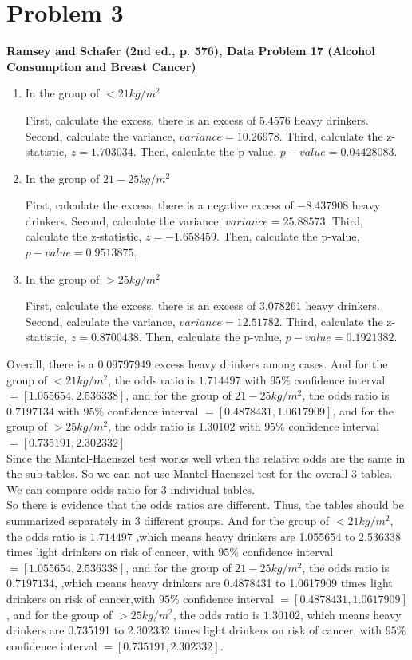 \documentclass[10pt,letterpaper]{article}
\begin{document}
\section*{Problem 3}
\textbf{Ramsey and Schafer (2nd ed., p. 576), Data Problem 17 (Alcohol Consumption and Breast Cancer)}
\begin{enumerate}[leftmargin=0cm,itemindent=.5cm,labelwidth=\itemindent,labelsep=0cm,align=left]
\item[\textbullet] In the group of $<21kg/m^2$

First, calculate the excess, there is an excess of $5.4576$ heavy drinkers. Second, calculate the variance, $variance= 10.26978$. Third, calculate the z-statistic, $z=1.703034$. Then, calculate the p-value, $p-value=0.04428083$.\\

\item[\textbullet] In the group of $21-25kg/m^2$

First, calculate the excess, there is a negative excess of $-8.437908$ heavy drinkers. Second, calculate the variance, $variance = 25.88573$. Third, calculate the z-statistic, $z=-1.658459$. Then, calculate the p-value, $p-value=0.9513875$.\\

\item[\textbullet] In the group of $>25kg/m^2$

First, calculate the excess, there is an excess of $3.078261$ heavy drinkers. Second, calculate the variance, $variance = 12.51782$. Third, calculate the z-statistic, $z=0.8700438$. Then, calculate the p-value, $p-value=0.1921382$.
 \end{enumerate}
Overall, there is a 0.09797949 excess heavy drinkers among cases. And for the group of $<21kg/m^2$, the odds ratio is $1.714497$ with 
 $95\%$ confidence interval $= [1.055654 , 2.536338]$, and for the group of $21-25kg/m^2$, the odds ratio is $0.7197134$ with 
 $95\%$ confidence interval $= [0.4878431 , 1.0617909]$, and for the group of $>25kg/m^2$, the odds ratio is $1.30102$ with 
 $95\%$ confidence interval $= [0.735191 , 2.302332]$\\

Since the Mantel-Haenszel test works well when the relative odds are the same in the sub-tables. So we can not use Mantel-Haenszel test for the overall 3 tables. We can compare odds ratio for 3 individual tables.\\
So there is evidence that the odds ratios are different. Thus, the tables should be summarized separately in 3 different groups. And for the group of $<21kg/m^2$, the odds ratio is $1.714497$ ,which means heavy drinkers are 1.055654 to 2.536338 times light drinkers on risk of cancer, with 
 $95\%$ confidence interval $= [1.055654 , 2.536338]$, and for the group of $21-25kg/m^2$, the odds ratio is $0.7197134$, ,which means heavy drinkers are 0.4878431 to 1.0617909 times light drinkers on risk of cancer,with $95\%$ confidence interval $= [0.4878431 , 1.0617909]$, and for the group of $>25kg/m^2$, the odds ratio is $1.30102$, which means heavy drinkers are 0.735191 to 2.302332 times light drinkers on risk of cancer, with  $95\%$ confidence interval $= [0.735191 , 2.302332]$.\\
\end{document}
